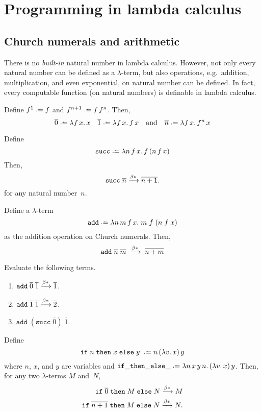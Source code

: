 \section{Programming in lambda calculus}
\subsection{Church numerals and arithmetic}
There is no \emph{built-in} natural number in lambda calculus. However, 
not only every natural number can be defined as a $\lambda$-term, but also 
operations, e.g.\ addition, multiplication, and even exponential, on natural
number can be defined. In fact, every computable function (on natural numbers)
is definable in lambda calculus. 

\begin{definition}
  Define $f^1 \defeq f$ and $f^{n+1} \defeq f\,f^n$. Then, 
  \[
    \overline{0} \defeq \lambda f\,x.\, x
    \quad
    \overline{1} \defeq \lambda f\,x.\, f\,x
    \quad\text{and}\quad
    \overline{n} \defeq \lambda f\,x.\, f^{n}\,x
  \] 
\end{definition}

\begin{definition}[Successor]
  Define
  \[
    \mathtt{succ} \defeq \lambda n\,f\,x.\, f\,(n\,f\,x)
  \]
  Then,
  \[
    \mathtt{succ}\;\overline{n} \xrightarrow{\beta*} \overline{n+1}.
  \]
  for any natural number~$n$.
\end{definition}
\begin{proposition}[Addition]
  Define a $\lambda$-term 
  \[
    \mathtt{add} \defeq \lambda n\,m\,f\,x.\; m\;f\;(n\;f\;x) 
  \]
  as the addition operation on Church numerals.
  Then, 
  \[
    \mathtt{add}\;\overline{n}\;\overline{m}\;
    \xrightarrow{\beta*}\;\overline{n + m}
  \]
\end{proposition}
\begin{example}
  Evaluate the following terms.
  \begin{enumerate}
    \item $\mathtt{add}\;\overline{0}\;\overline{1}
      \xrightarrow{\beta*} \overline{1}$.
    \item $\mathtt{add}\;\overline{1}\;\overline{1}
      \xrightarrow{\beta*} \overline{2}$.
    \item $\mathtt{add}\;(\mathtt{succ}\;\overline{0})\;\overline{1}$.
    \end{enumerate}
\end{example}

\begin{proposition}[Conditional]
  Define 
  \[
    \mathtt{if}\;n\;\mathtt{then}\;x\;\mathtt{else}\;y\; \defeq 
    n\,(\lambda v.\,x)\,y 
  \]
  where $n$, $x$, and $y$ are variables and 
  $\mathtt{if\_then\_else\_} \defeq \lambda n\,x\,y\,n.\,(\lambda v.\, x)\, y$.
  Then, for any two $\lambda$-terms $M$ and~$N$,
  \begin{align*}
    \mathtt{if}\;\overline{0}\;\mathtt{then}\;M\;\mathtt{else}\;N
    \xrightarrow{\beta*} M \\ 
    \mathtt{if}\;\overline{n+1}\;\mathtt{then}\;M\;\mathtt{else}\;N
    \xrightarrow{\beta*} N.
  \end{align*}
\end{proposition}
